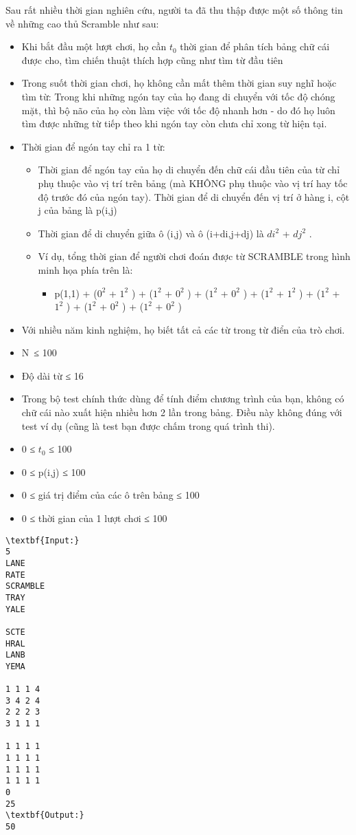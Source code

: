 Sau rất nhiều thời gian nghiên cứu, người ta đã thu thập được một số thông tin về những cao thủ Scramble như sau:
\begin{itemize}
	\item Khi bắt đầu một lượt chơi, họ cần $t_{0}$ thời gian để phân tích bảng chữ cái được cho, tìm chiến thuật thích hợp cũng như tìm từ đầu tiên
	\item Trong suốt thời gian chơi, họ không cần mất thêm thời gian suy nghĩ hoặc tìm từ: Trong khi những ngón tay của họ đang di chuyển với tốc độ chóng mặt, thì bộ não của họ còn làm việc với tốc độ nhanh hơn - do đó họ luôn tìm được những từ tiếp theo khi ngón tay còn chưa chỉ xong từ hiện tại.
	\item Thời gian để ngón tay chỉ ra 1 từ:
\begin{itemize}
	\item Thời gian để ngón tay của họ di chuyển đến chữ cái đầu tiên của từ chỉ phụ thuộc vào vị trí trên bảng (mà KHÔNG phụ thuộc vào vị trí hay tốc độ trước đó của ngón tay). Thời gian để di chuyển đến vị trí ở hàng i, cột j của bảng là p(i,j)
	\item Thời gian để di chuyển giữa ô (i,j) và ô (i+di,j+dj) là $di^{2}$ + $dj^{2}$ .
	\item Ví dụ, tổng thời gian để người chơi đoán được từ SCRAMBLE trong hình minh họa phía trên là:
\begin{itemize}
	\item p(1,1) + ($0^{2}$ + $1^{2}$ ) + ($1^{2}$ + $0^{2}$ ) + ($1^{2}$ + $0^{2}$ ) + ($1^{2}$ + $1^{2}$ ) + ($1^{2}$ + $1^{2}$ ) + ($1^{2}$ + $0^{2}$ ) + ($1^{2}$ + $0^{2}$ )
\end{itemize}
\end{itemize}
	\item Với nhiều năm kinh nghiệm, họ biết tất cả các từ trong từ điển của trò chơi.
\end{itemize}
\begin{itemize}
	\item N ≤ 100
	\item Độ dài từ ≤ 16
	\item Trong bộ test chính thức dùng để tính điểm chương trình của bạn, không có chữ cái nào xuất hiện nhiều hơn 2 lần trong bảng. Điều này không đúng với test ví dụ (cũng là test bạn được chấm trong quá trình thi).
	\item 0 ≤ $t_{0}$ ≤ 100
	\item 0 ≤ p(i,j) ≤ 100
	\item 0 ≤ giá trị điểm của các ô trên bảng ≤ 100
	\item 0 ≤ thời gian của 1 lượt chơi ≤ 100
\end{itemize}
\begin{verbatim}
\textbf{Input:}
5
LANE
RATE
SCRAMBLE
TRAY
YALE

SCTE
HRAL
LANB
YEMA

1 1 1 4
3 4 2 4
2 2 2 3
3 1 1 1

1 1 1 1
1 1 1 1
1 1 1 1
1 1 1 1
0
25
\textbf{Output:}
50
\end{verbatim}